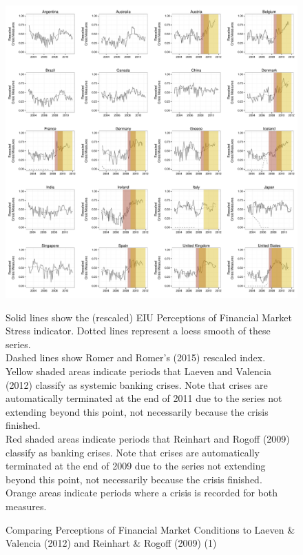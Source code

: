 \documentclass[]{article}
\begin{document}
\begin{figure}
    \caption{Comparing Perceptions of Financial Market Conditions to Laeven \& Valencia (2012) and Reinhart \& Rogoff (2009) (1)}
    \label{compare_1}
    \begin{center}
        \includegraphics[scale=0.4]{analysis/figures/compare_to_lv_rr.pdf}
    \end{center}

    {\tiny{Solid lines show the (rescaled) EIU Perceptions of Financial Market Stress indicator. Dotted lines represent a loess smooth of these series. \\

    Dashed lines show Romer and Romer's (2015) rescaled index. \\

    Yellow shaded areas indicate periods that Laeven and Valencia (2012) classify as systemic banking crises. Note that crises are automatically terminated at the end of 2011 due to the series not extending beyond this point, not necessarily because the crisis finished. \\

    Red shaded areas indicate periods that Reinhart and Rogoff (2009) classify as banking crises. Note that crises are automatically terminated at the end of 2009 due to the series not extending beyond this point, not necessarily because the crisis finished. \\

    Orange areas indicate periods where a crisis is recorded for both measures.}}
\end{figure}
\end{document}
